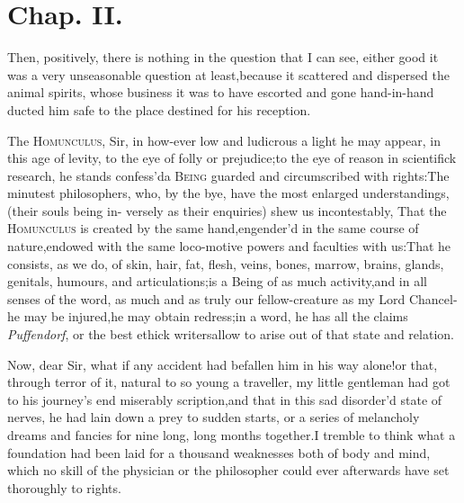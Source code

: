 \documentclass{article}
\begin{document}
\newpage
\section{Chap. II.}

\quad \tsk Then, positively, there is nothing in the question that I can see, either good
it was a very unseasonable question at
least,\tsk  because it scattered and dispersed the animal spirits, whose business it
was to have escorted and gone hand-in-hand 
ducted him safe to the place destined for his reception.

The \textsc{Homunculus}, Sir, in how-ever low and ludicrous a light he may appear,
in this age of levity, to the eye of folly or prejudice;\tsk  to the eye of reason
in scientifick research, he stands confess’d\tsk\break a \textsc{Being} guarded and
circumscribed with rights:\tsh  The minutest philosophers,\pb 
who, by the bye, have the most enlarged understandings, (their souls being in-\break 
versely as their enquiries) shew us incontestably, That the \textsc{Homunculus} is
created by the same hand,\tsk engender’d in the same course of nature,\tsk  endowed
with the same loco-motive powers and faculties with us:\tsk  That he consists,\break
as we do, of skin, hair, fat, flesh, veins,\break
{}\break
bones, marrow, brains, glands, genitals, humours, and articulations;\tsk  is a Being
of as much activity,\tsk  and in all senses of the word, as much and as truly our
fellow-creature as my Lord Chancel-\break
{}
he may be injured,\tsk  he may obtain redress;\tsk in a word, he has all the claims
\textit{Puffendorf}, or the best ethick writers\pb allow to arise out of that state and relation.

Now, dear Sir, what if any accident had befallen him in his way
alone!\tsk\break  or that, through terror of it, natural to so young a
traveller, my little gentleman had got to his journey’s end
miserably 
scription,\tsk  and that in this sad disorder’d state of
nerves, he had lain down a prey to sudden starts, or a series of
melancholy dreams and fancies for nine long, long months
together.\tsh  I tremble to think what a foundation had been laid
for a thousand weaknesses both of body and mind, which no skill of
the physician or the philosopher could ever afterwards have set
thoroughly to rights.
\end{document}
